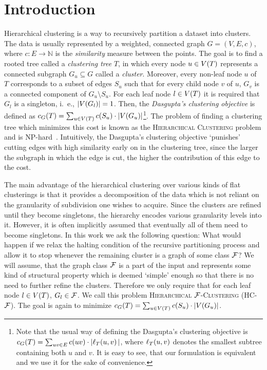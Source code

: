 \section{Introduction}
Hierarchical clustering is a way to recursively partition a dataset into clusters. The data is usually represented by a weighted, connected graph $G = (V, E, c)$, where $c\colon E\to \mathbb{N}$ is the \emph{similarity} measure between the points. The goal is to find a rooted tree called a \textit{clustering tree} $T$, in which every node $u\in V\mathopen{}\left( T \right)$ represents a connected subgraph $G_u\subseteq G$ called a \textit{cluster}. Moreover, every non-leaf node $u$ of $T$ corresponds to a subset of edges $S_u$ such that for every child node $v$ of $u$, $G_v$ is a connected component of $G_u\setminus S_u$. For each leaf node $l\in V\mathopen{}\left( T \right)$ it is required that $G_l$ is a singleton, i.~e., $\mathopen{}\left| V\mathopen{}\left( G_l \right) \right|=1$. Then, the \textit{Dasgupta's clustering objective} is defined as ${c}_G\mathopen{}\left( T \right) = \sum_{u\in V\mathopen{}\left( T \right)} c(S_u) \cdot |V(G_u)|$\footnote{Note that the usual way of defining the Dasgupta's clustering objective is ${c}_G\mathopen{}\left( T \right) = \sum_{uv\in E} c(uv) \cdot |\ell_T\mathopen{}\left( u,v \right)|$, where $\ell_T\mathopen{}\left( u,v \right)$ denotes the smallest subtree containing both $u$ and $v$. It is easy to see, that our formulation is equivalent and we use it for the sake of convenience.}. The problem of finding a clustering tree which minimizes this cost is known as the \textsc{Hierarchical Clustering} problem and is NP-hard~\cite{ACostFunctionForSimilarityBasedHierarchicalClustering}. Intuitively, the Dasgupta's clustering objective `punishes' cutting edges with high similarity early on in the clustering tree, since the larger the subgraph in which the edge is cut, the higher the contribution of this edge to the cost.

The main advantage of the hierarchical clustering over various kinds of flat clusterings is that it provides a decomposition of the data which is not reliant on the granularity of subdivision one wishes to acquire. Since the clusters are refined until they become singletons, the hierarchy encodes various granularity levels into it. However, it is often implicitly assumed that eventually all of them need to become singletons. In this work we ask the following question: What would happen if we relax the halting condition of the recursive partitioning process and allow it to stop whenever the remaining cluster is a graph of some class $\mathcal{F}$?
We will assume, that the graph class $\mathcal{F}$ is a part of the input and represents some kind of structural property which is deemed `simple' enough so that there is no need to further refine the clusters.
Therefore we only require that for each leaf node $l\in V\mathopen{}\left( T \right)$, $G_l\in \mathcal{F}$. We call this problem \textsc{Hierarchical $\mathcal{F}$-Clustering} (HC-$\mathcal{F}$). The goal is again to minimize ${c}_G\mathopen{}\left( T \right) = \sum_{u\in V\mathopen{}\left( T \right)} c(S_u) \cdot |V(G_u)|$.

